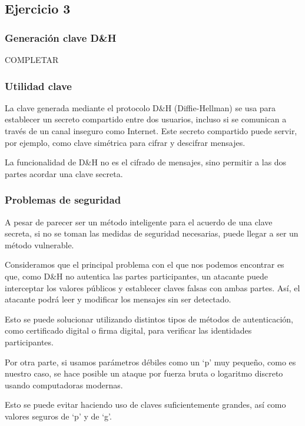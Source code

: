 \subsection{Ejercicio 3}
\graphicspath{ {img/3} }

\subsubsection{Generación clave D&H}

COMPLETAR

\subsubsection{Utilidad clave}

La clave generada mediante el protocolo D&H (Diffie-Hellman) se usa para establecer un secreto compartido entre dos usuarios, incluso si se comunican a través de un canal inseguro como Internet. Este secreto compartido puede servir, por ejemplo, como clave simétrica para cifrar y descifrar mensajes. 

La funcionalidad de D&H no es el cifrado de mensajes, sino permitir a las dos partes acordar una clave secreta. 

\subsubsection{Problemas de seguridad}

A pesar de parecer ser un método inteligente para el acuerdo de una clave secreta, si no se toman las medidas de seguridad necesarias, puede llegar a ser un método vulnerable.  

Consideramos que el principal problema con el que nos podemos encontrar es que, como D&H no autentica las partes participantes, un atacante puede interceptar los valores públicos y establecer claves falsas con ambas partes. Así, el atacante podrá leer y modificar los mensajes sin ser detectado. 

Esto se puede solucionar utilizando distintos tipos de métodos de autenticación, como certificado digital o firma digital, para verificar las identidades participantes. 

Por otra parte, si usamos parámetros débiles como un ‘p’ muy pequeño, como es nuestro caso, se hace posible un ataque por fuerza bruta o logaritmo discreto usando computadoras modernas. 

Esto se puede evitar haciendo uso de claves suficientemente grandes, así como valores seguros de ‘p’ y de ‘g’. 